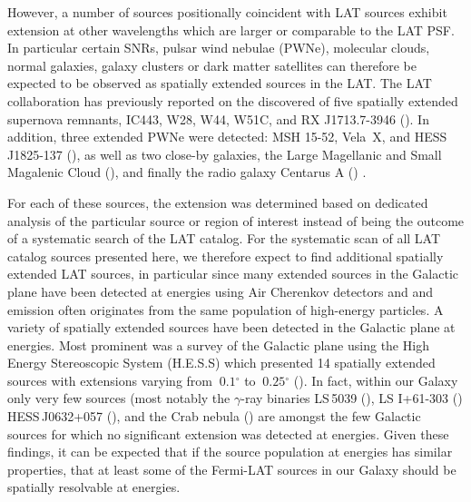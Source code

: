 \documentclass[12pt,preprint]{aastex}
\newcommand{\gev}{\text{GeV}\xspace}
\newcommand{\tev}{\text{TeV}\xspace}
\renewcommand{\deg}{\ensuremath{^\circ}\xspace}
\begin{document}
However, a number of sources positionally coincident with LAT sources
exhibit extension at other wavelengths which are larger or comparable to
the LAT PSF.  In particular certain SNRs, pulsar wind nebulae (PWNe),
molecular clouds, normal galaxies, galaxy clusters or dark matter
satellites can therefore be expected to be observed as spatially extended
sources in the LAT.  The LAT collaboration has previously reported on the
discovered of five spatially extended supernova remnants, IC443, W28, W44,
W51C, and RX J1713.7-3946 (\cite{ic443,w28,w44,w51c,rx_j1713_lat}). In
addition, three extended PWNe were detected: MSH 15-52, Vela~X,
and HESS\,J1825-137 (\cite{msh1552,velax,fermi_hess_j1825}), as well
as two close-by galaxies, the Large Magellanic and Small Magalenic
Cloud (\cite{lmc,smc}), and finally the radio galaxy Centarus A
(\cite{cen_a_lat}) .

For each of these sources, the extension was determined based on
dedicated analysis of the particular source or region of interest
instead of being the outcome of a systematic search of the LAT catalog.
For the systematic scan of all LAT catalog sources presented here, we
therefore expect to find additional spatially extended LAT sources, in
particular since many extended sources in the Galactic plane have been
detected at \tev energies using Air Cherenkov detectors and \tev and
\gev emission often originates from the same population of high-energy
particles.  A variety of spatially extended sources have been detected
in the Galactic plane at \tev energies. Most prominent was a survey of
the Galactic plane using the High Energy Stereoscopic System (H.E.S.S)
which presented 14 spatially extended sources
 with extensions varying from
$~0.1\deg$ to $~0.25\deg$ (\cite{hess_plane_survey}). In fact, within
our Galaxy only very few sources (most notably the $\gamma$-ray binaries
LS\,5039 (\cite{HESSLS5039}), LS I+61-303 (\cite{MAGICLSI, VERITASLSI})
HESS\,J0632+057 (\cite{HESS0632}), and the Crab nebula (\cite{crab_weekes})
are amongst the few Galactic sources
for which no significant extension was detected at \tev energies. Given
these findings, it can be expected that if the source population at \gev
energies has similar properties, that at least some of the Fermi-LAT
sources in our Galaxy should be spatially resolvable at \gev energies.


\end{document}
